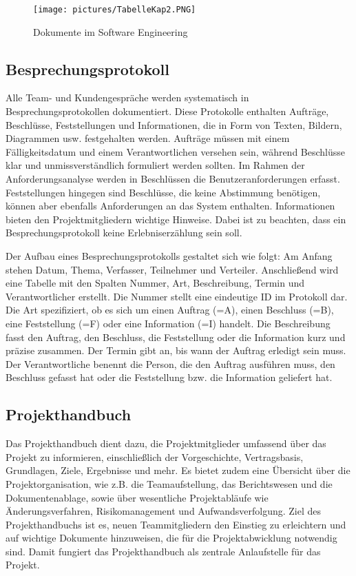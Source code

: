 \begin{figure}[H]
    \centering
    \texttt{[image: pictures/TabelleKap2.PNG]}
    \caption{Dokumente im Software Engineering}
    \label{Dokumente Software Engineering}
\end{figure}

\clearpage

\subsection{Besprechungsprotokoll}  \label{Besprechungsprotokoll}

Alle Team- und Kundengespräche werden systematisch in Besprechungsprotokollen dokumentiert. Diese Protokolle enthalten 
Aufträge, Beschlüsse, Feststellungen und Informationen, die in Form von Texten, Bildern, Diagrammen usw. festgehalten 
werden. Aufträge müssen mit einem Fälligkeitsdatum und einem Verantwortlichen versehen sein, während Beschlüsse klar 
und unmissverständlich formuliert werden sollten. Im Rahmen der Anforderungsanalyse werden in Beschlüssen die 
Benutzeranforderungen erfasst. Feststellungen hingegen sind Beschlüsse, die keine Abstimmung benötigen, können 
aber ebenfalls Anforderungen an das System enthalten. Informationen bieten den Projektmitgliedern wichtige Hinweise. 
Dabei ist zu beachten, dass ein Besprechungsprotokoll keine Erlebniserzählung sein soll.

Der Aufbau eines Besprechungsprotokolls gestaltet sich wie folgt: Am Anfang stehen Datum, Thema, Verfasser, 
Teilnehmer und Verteiler. Anschließend wird eine Tabelle mit den Spalten Nummer, Art, Beschreibung, Termin und 
Verantwortlicher erstellt. Die Nummer stellt eine eindeutige ID im Protokoll dar. Die Art spezifiziert, ob es sich 
um einen Auftrag (=A), einen Beschluss (=B), eine Feststellung (=F) oder eine Information (=I) handelt. Die 
Beschreibung fasst den Auftrag, den Beschluss, die Feststellung oder die Information kurz und präzise zusammen. Der 
Termin gibt an, bis wann der Auftrag erledigt sein muss. Der Verantwortliche benennt die Person, die den Auftrag 
ausführen muss, den Beschluss gefasst hat oder die Feststellung bzw. die Information geliefert hat.

\subsection{Projekthandbuch}  \label{Projekthandbuch}

Das Projekthandbuch dient dazu, die Projektmitglieder umfassend über das Projekt zu informieren, einschließlich der 
Vorgeschichte, Vertragsbasis, Grundlagen, Ziele, Ergebnisse und mehr. Es bietet zudem eine Übersicht über die 
Projektorganisation, wie z.B. die Teamaufstellung, das Berichtswesen und die Dokumentenablage, sowie über wesentliche 
Projektabläufe wie Änderungsverfahren, Risikomanagement und Aufwandsverfolgung. Ziel des Projekthandbuchs ist es, neuen 
Teammitgliedern den Einstieg zu erleichtern und auf wichtige Dokumente hinzuweisen, die für die Projektabwicklung 
notwendig sind. Damit fungiert das Projekthandbuch als zentrale Anlaufstelle für das Projekt.

